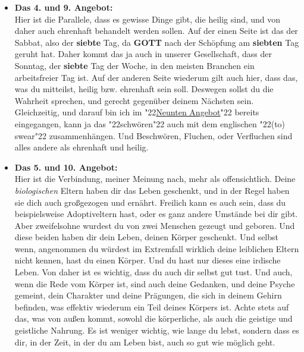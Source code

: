 \documentclass[10pt,a5paper]{article}
\newcommand{\Er}[0]{\textbf{ER}}
\newcommand{\Gott}[0]{\textbf{GOTT}}
\newcommand{\Seiner}[0]{\textbf{SEINER}}
\newcommand{\q}[1]{\char"22{#1}\char"22 }
\begin{document}
\begin{itemize}
					du springst aus dem Fenster,
					und sagst dir sowas wie:
					\q{Wenn es {\Gott} gibt, wird {\Er} mich auffangen.}.
					Damit w\"urdest du also einen Teil {\Seiner} Allmacht \q{stehlen} (wollen).
					Und auf der anderen Seite,
					gegen\"uber deinem Mitmenschen,
					ist es ja klar,
					dass gemeint ist,
					dass du deinem Mitmenschen nichts unberechtigt entwendest,
					also richtiger Diebstahl,
					oder auch Dienstleistungen unberechtigt in Anspruch nimmst:
					\q{Dienstleistungs-Diebstahl},
					was man \"ublicherweise mit \q{Betrug} bezeichnet.
			\item	\textbf{Das 4. und 9. Angebot:}
			\\		Hier ist die Parallele,
					dass es gewisse Dinge gibt,
					die heilig sind,
					und von daher auch ehrenhaft behandelt werden sollen.
					Auf der einen Seite ist das der Sabbat,
					also der \textbf{siebte} Tag,
					da {\Gott} nach der Sch\"opfung am \textbf{siebten} Tag geruht hat.
					Daher kommt das ja auch in unserer Gesellschaft,
					dass der Sonntag,
					der \textbf{siebte} Tag der Woche,
					in den meisten Branchen ein arbeitsfreier Tag ist.
					Auf der anderen Seite wiederum gilt auch hier,
					dass das,
					was du mitteilst,
					heilig bzw. ehrenhaft sein soll.
					Deswegen sollst du die Wahrheit sprechen,
					und gerecht gegen\"uber deinem N\"achsten sein.
					Gleichzeitig,
					und darauf bin ich im \q{\hyperref[DasNeunteAngebot]{Neunten Angebot}} bereits eingegangen,
					kann ja das \q{schw\"oren} auch mit dem englischen \q{(to) swear} zusammenh\"angen.
					Und Beschw\"oren,
					Fluchen,
					oder Verfluchen
					sind alles andere als ehrenhaft und heilig.
			\item	\textbf{Das 5. und 10. Angebot:}
			\\		Hier ist die Verbindung,
					meiner Meinung nach,
					mehr als offensichtlich.
					Deine \textit{biologischen} Eltern haben dir das Leben geschenkt,
					und in der Regel haben sie dich auch gro{\ss}gezogen und ern\"ahrt.
					Freilich kann es auch sein,
					dass du beispielsweise Adoptiveltern hast,
					oder es ganz andere Umst\"ande bei dir gibt.
					Aber zweifelsohne wurdest du von zwei Menschen gezeugt und geboren.
					Und diese beiden haben dir dein Leben,
					deinen K\"orper geschenkt.
					Und selbst wenn,
					angenommen du w\"urdest im Extremfall wirklich deine leiblichen Eltern nicht kennen,
					hast du einen K\"orper.
					Und du hast nur dieses eine irdische Leben.
					Von daher ist es wichtig,
					dass du auch dir selbst gut tust.
					Und auch,
					wenn die Rede vom K\"orper ist,
					sind auch deine Gedanken,
					und deine Psyche gemeint,
					dein Charakter und deine Pr\"agungen,
					die sich in deinem Gehirn befinden,
					was effektiv wiederum ein Teil deines K\"orpers ist.
					Achte stets auf das,
					was von au{\ss}en kommt,
					sowohl die k\"orperliche,
					als auch die geistige und geistliche Nahrung.
					Es ist weniger wichtig,
					wie lange du lebst,
					sondern dass es dir,
					in der Zeit,
					in der du am Leben bist,
					auch so gut wie m\"oglich geht.
		\end{itemize}
	
\end{document}
